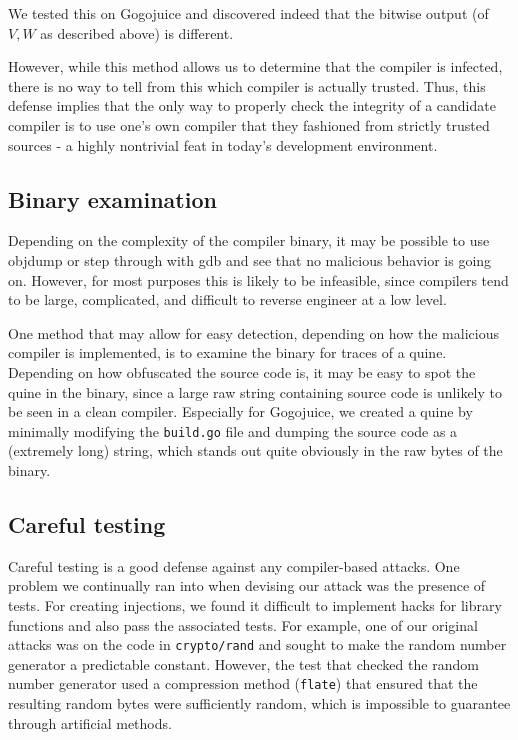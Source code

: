 \documentclass[10pt]{sigplanconf}
\begin{document}
We tested this on Gogojuice and discovered indeed that the bitwise output (of $V,W$ as described above) is different.

However, while this method allows us to determine that the compiler is infected, there is no way to tell from this which compiler is actually trusted. Thus, this defense implies that the only way to properly check the integrity of a candidate compiler is to use one's own compiler that they fashioned from strictly trusted sources - a highly nontrivial feat in today's development environment. 

\subsection{Binary examination}

Depending on the complexity of the compiler binary, it may be possible to use objdump or step through with gdb and see that no malicious behavior is going on. However, for most purposes this is likely to be infeasible, since compilers tend to be large, complicated, and difficult to reverse engineer at a low level.

One method that may allow for easy detection, depending on how the malicious compiler is implemented, is to examine the binary for traces of a quine. Depending on how obfuscated the source code is, it may be easy to spot the quine in the binary, since a large raw string containing source code is unlikely to be seen in a clean compiler. Especially for Gogojuice, we created a quine by minimally modifying the \texttt{build.go} file and dumping the source code as a (extremely long) string, which stands out quite obviously in the raw bytes of the binary.

\subsection{Careful testing}

Careful testing is a good defense against any compiler-based attacks. One problem we continually ran into when devising our attack was the presence of tests. For creating injections, we found it difficult to implement hacks for library functions and also pass the associated tests. For example, one of our original attacks was on the code in \texttt{crypto/rand} and sought to make the random number generator a predictable constant. However, the test that checked the random number generator used a compression method (\texttt{flate}) that ensured that the resulting random bytes were sufficiently random, which is impossible to guarantee through artificial methods.
\end{document}
